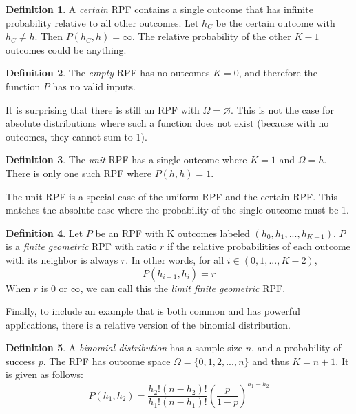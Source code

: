 \documentclass[twoside]{article}
\theoremstyle{plain}%
\theoremstyle{definition}
\newtheorem{definition}{Definition}[section]
\theoremstyle{remark}
\begin{document}
\begin{definition}
A \textit{certain} RPF contains a single outcome that has infinite probability relative to all other outcomes. Let \(h_C\) be the certain outcome with \(h_C \neq h\). Then \(P(h_C, h) = \infty\). The relative probability of the other \(K-1\) outcomes could be anything.
\end{definition}

\begin{definition}
\label{def:empty_rpf}
The \textit{empty} RPF has no outcomes \(K = 0\), and therefore the function \(P\) has no valid inputs.
\end{definition}

It is surprising that there is still an RPF with \(\Omega = \varnothing\). This is not the case for absolute distributions where such a function does not exist (because with no outcomes, they cannot sum to 1).

\begin{definition}
\label{def:unit_rpf}
The \textit{unit} RPF has a single outcome where \(K = 1\) and \(\Omega = h\). There is only one such RPF where \(P(h, h) = 1\).
\end{definition}

The unit RPF is a special case of the uniform RPF and the certain RPF. This matches the absolute case where the probability of the single outcome must be 1.

\begin{definition}
\label{def:finite_geometric_rpf}
Let \(P\) be an RPF with K outcomes labeled \((h_0, h_1, ..., h_{K-1})\). \(P\) is a \textit{finite geometric} RPF with ratio \(r\) if the relative probabilities of each outcome with its neighbor is always \(r\). In other words, for all \(i \in (0, 1, ..., K-2)\),
\[P(h_{i+1}, h_i) = r\]
When \(r\) is 0 or \(\infty\), we can call this the \textit{limit finite geometric} RPF.
\end{definition}

Finally, to include an example that is both common and has powerful applications, there is a relative version of the binomial distribution.

\begin{definition}
\label{def:binomial_rpf}
A \textit{binomial distribution} has a sample size \(n\), and a probability of success \(p\). The RPF has outcome space \(\Omega = \{0, 1, 2, ..., n\}\) and thus \(K = n + 1\). It is given as follows:
\[P(h_1, h_2) = \frac{h_2!(n-h_2)!}{h_1!(n-h_1)!}\left(\frac{p}{1-p}\right)^{h_1 - h_2}\]
\end{definition}
\end{document}
